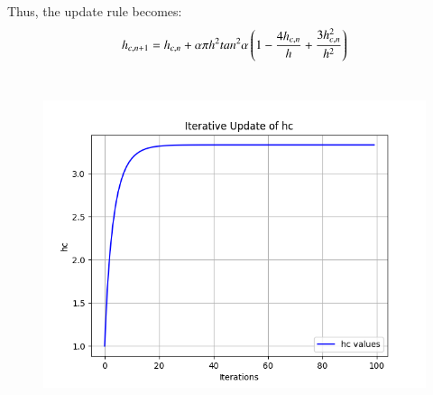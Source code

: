 \documentclass[journal]{IEEEtran}
\begin{document}
 Thus, the update rule becomes:\\
 \begin{align}
     h_{c,n+1}=h_{c,n}+\alpha\pi h^{2}tan^{2}\alpha\left(1-\frac{4h_{c,n}}{h}+\frac{3h^{2}_{c,n}}{h^{2}}\right)
 \end{align}\\
\begin{figure}[h!]
   \centering
   \includegraphics[width=\columnwidth]{figure/fig.png}
\end{figure}



 
\end{document}
